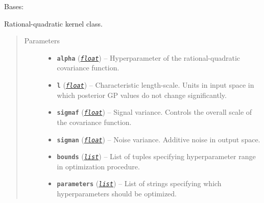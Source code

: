 \documentclass[letterpaper,10pt,english]{sphinxmanual}
\begin{document}

\begin{fulllineitems}
\label{pyGPGO.covfunc:pyGPGO.covfunc.rationalQuadratic}
Bases: \href{https://docs.python.org/2/library/functions.html\#object}{}

Rational-quadratic kernel class.
\begin{quote}\begin{description}
\item[{Parameters}] \leavevmode\begin{itemize}
\item {} 
\textbf{\texttt{alpha}} (\href{https://docs.python.org/2/library/functions.html\#float}{\emph{\texttt{float}}}) -- Hyperparameter of the rational-quadratic covariance function.

\item {} 
\textbf{\texttt{l}} (\href{https://docs.python.org/2/library/functions.html\#float}{\emph{\texttt{float}}}) -- Characteristic length-scale. Units in input space in which posterior GP values do not
change significantly.

\item {} 
\textbf{\texttt{sigmaf}} (\href{https://docs.python.org/2/library/functions.html\#float}{\emph{\texttt{float}}}) -- Signal variance. Controls the overall scale of the covariance function.

\item {} 
\textbf{\texttt{sigman}} (\href{https://docs.python.org/2/library/functions.html\#float}{\emph{\texttt{float}}}) -- Noise variance. Additive noise in output space.

\item {} 
\textbf{\texttt{bounds}} (\href{https://docs.python.org/2/library/functions.html\#list}{\emph{\texttt{list}}}) -- List of tuples specifying hyperparameter range in optimization procedure.

\item {} 
\textbf{\texttt{parameters}} (\href{https://docs.python.org/2/library/functions.html\#list}{\emph{\texttt{list}}}) -- List of strings specifying which hyperparameters should be optimized.

\end{itemize}


\end{description}
\end{quote}
\end{fulllineitems}
\end{document}

